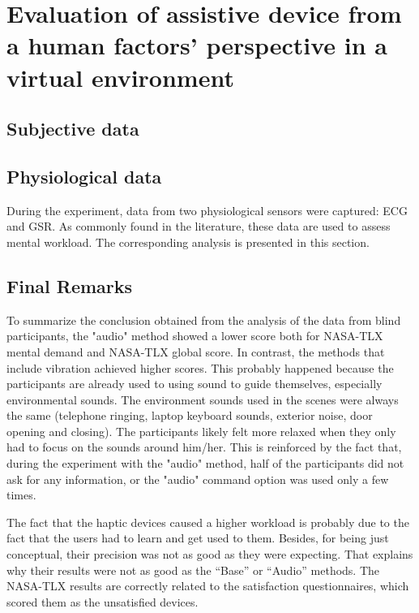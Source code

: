 \section{Evaluation of assistive device from a human factors' perspective in a virtual environment}
\label{sec:results_obj_1}

\subsection{Subjective data}




\subsection{Physiological data}

During the experiment, data from two physiological sensors were captured: ECG and GSR. As commonly found in the literature, these data are used to assess mental workload. The corresponding analysis is presented in this section.




\subsection{Final Remarks}

To summarize the conclusion obtained from the analysis of the data from blind participants, the "audio" method showed a lower score both for NASA-TLX mental demand and NASA-TLX global score. In contrast, the methods that include vibration achieved higher scores. This probably happened because the participants are already used to using sound to guide themselves, especially environmental sounds. The environment sounds used in the scenes were always the same (telephone ringing, laptop keyboard sounds, exterior noise, door opening and closing). The participants likely felt more relaxed when they only had to focus on the sounds around him/her. This is reinforced by the fact that, during the experiment with the "audio" method, half of the participants did not ask for any information, or the "audio" command option was used only a few times.

The fact that the haptic devices caused a higher workload is probably due to the fact that the users had to learn and get used to them. Besides, for being just conceptual, their precision was not as good as they were expecting. That explains why their results were not as good as the “Base” or “Audio” methods. The NASA-TLX results are correctly related to the satisfaction questionnaires, which scored them as the unsatisfied devices.

